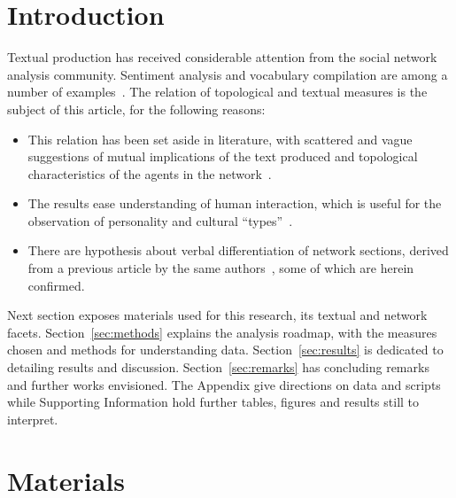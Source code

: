 \documentclass[%
 aip,
 jmp,%
 amsmath,amssymb,
 reprint,%
]{revtex4-1}
\begin{document}
\section{Introduction}
Textual production has received considerable attention from the social network analysis community.
Sentiment analysis and vocabulary compilation are among a number of examples~\cite{easley}.
The relation of topological and textual measures is the subject of this article, for the following reasons:
\begin{itemize}
    \item This relation has been set aside in literature, with scattered and vague suggestions of mutual implications of the text produced and topological characteristics of the agents in the network~\cite{easley}.
    \item The results ease understanding of human interaction, which is useful for the observation of personality and cultural ``types''~\cite{Deborah}.
    \item There are hypothesis about verbal differentiation of network sections,
	    derived from a previous article by the same authors~\cite{evoSN},
	    some of which are herein confirmed.
\end{itemize}

Next section exposes materials used for this research, its textual and network facets.
Section~\ref{sec:methods} explains the analysis roadmap, with the measures chosen and methods
for understanding data. Section~\ref{sec:results} is dedicated to detailing results and discussion.
Section~\ref{sec:remarks} has concluding remarks and further works envisioned.
The Appendix give directions on data and scripts while
Supporting Information hold further tables, figures and results still to interpret.

\section{Materials}\label{sec:materials}
%
\end{document}
